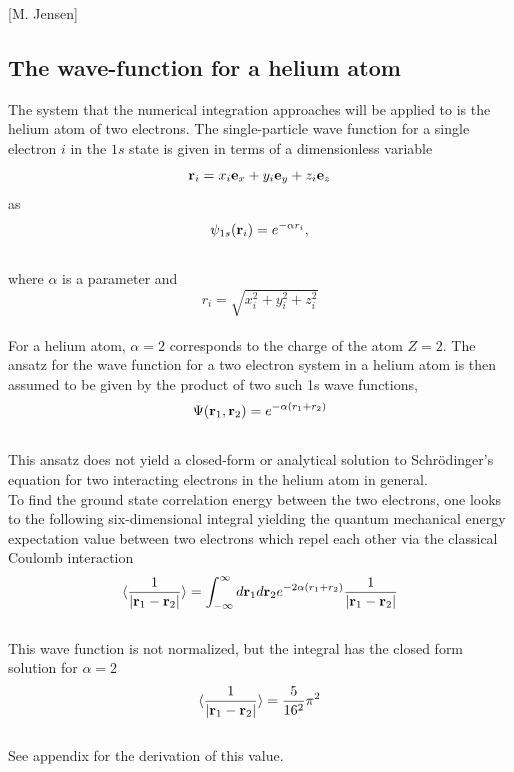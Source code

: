 \documentclass[%
reprint,
amsmath,amssymb,
aps,
]{revtex4-1}
\begin{document}
\hspace{50mm}[M. Jensen]
\subsection*{The wave-function for a helium atom} \noindent 
The system that the numerical integration approaches will be applied to is the helium atom of two electrons. The single-particle wave function for a single electron $i$ in the $1s$ state is given in terms of a dimensionless variable 
\begin{equation*}
	 {\bf r}_i =  x_i {\bf e}_x + y_i {\bf e}_y +z_i {\bf e}_z 
\end{equation*}
as 
\begin{equation*}
	\psi_{1s}({\bf r}_i)  =   e^{-\alpha r_i},
\end{equation*}\vspace{1mm} \\
where $\alpha$ is a parameter and \vspace{1mm} \\
\begin{equation*}
	r_i = \sqrt{x_i^2+y_i^2+z_i^2}
\end{equation*}\vspace{2mm} \\
For a helium atom, $\alpha = 2$ corresponds to the charge of the atom $Z = 2$. The ansatz for the wave function for a two electron system in a helium atom is then assumed to be given by the product of two such 1s wave functions,  \\
\begin{equation}\label{waveequation}
	\Psi({\bf r}_1,{\bf r}_2)  =   e^{-\alpha (r_1+r_2)}
\end{equation}\vspace{2mm} \\
This ansatz does not yield a closed-form or analytical solution to Schrödinger's equation for two interacting electrons in the helium atom in general. \\ \indent 
To find the ground state correlation energy between the two electrons, one looks to the following six-dimensional integral yielding the quantum mechanical energy expectation value between two electrons which repel each other via the classical Coulomb interaction\vspace{2mm} \\
\begin{equation}\label{ccintegration}
	   \langle \frac{1}{|{\bf r}_1-{\bf r}_2|} \rangle =
	\int_{-\infty}^{\infty} d{\bf r}_1d{\bf r}_2  e^{-2\alpha (r_1+r_2)}\frac{1}{|{\bf r}_1-{\bf r}_2|}
\end{equation}\vspace{2mm} \\
This wave function is not normalized, but the integral has the closed form solution for $\alpha = 2$\vspace{2mm} \\
\begin{equation*}
\langle \frac{1}{|{\bf r}_1-{\bf r}_2|} \rangle = \dfrac{5}{16^2}\pi^2
\end{equation*}\vspace{2mm} \\
See appendix for the derivation of this value. 
\end{document}
